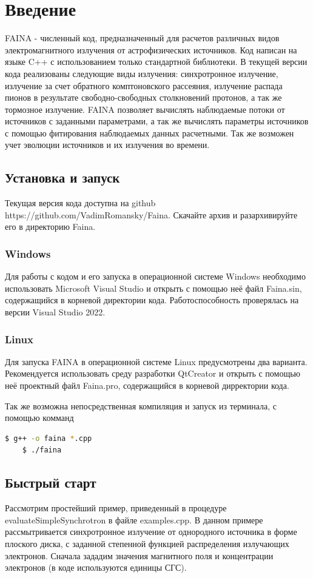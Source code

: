 \chapter*{Введение}		
FAINA - численный код, предназначенный для расчетов различных видов электромагнитного излучения от астрофизических источников. Код написан на языке C++ с использованием только стандартной библиотеки. В текущей версии кода реализованы следующие виды излучения: синхротронное излучение, излучение за счет обратного комптоновского рассеяния, излучение распада пионов в результате свободно-свободных столкновений протонов, а так же тормозное излучение. FAINA позволяет вычислять наблюдаемые потоки от источников с заданными параметрами, а так же вычислять параметры источников с помощью фитирования наблюдаемых данных расчетными. Так же возможен учет эволюции источников и их излучения во времени.

\section*{Установка и запуск}
Текущая версия кода доступна на github https://github.com/VadimRomansky/Faina. Скачайте архив и разархивируйте его в директорию Faina.
\subsection*{Windows}
Для работы с кодом и его запуска в операционной системе Windows необходимо использовать Microsoft Visual Studio и открыть с помощью неё файл Faina.sin, содержащийся в корневой директории кода. Работоспособность проверялась на версии Visual Studio 2022.
\subsection*{Linux}
Для запуска FAINA в операционной системе Linux предусмотрены два варианта. Рекомендуется использовать среду разработки QtCreator и открыть с помощью неё проектный файл Faina.pro, содержащийся в корневой дирректории кода. 

Так же возможна непосредственная компиляция и запуск из терминала, с помощью комманд
\begin{lstlisting}[language=bash]
	$ g++ -o faina *.cpp
	$ ./faina
\end{lstlisting}
\section*{Быстрый старт}\label{quickStart}
Рассмотрим простейший пример, приведенный в процедуре evaluateSimpleSynchrotron в файле examples.cpp. В данном примере рассмытривается синхротронное излучение от однородного источника в форме плоского диска, с заданной степенной функцией распределения излучающих электронов. Сначала зададим значения магнитного поля и концентрации электронов (в коде используются единицы СГС).

